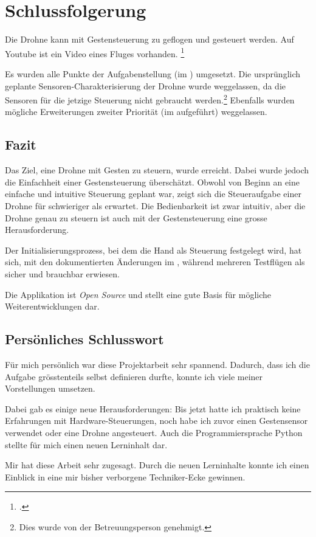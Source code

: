 \chapter{Schlussfolgerung}
Die Drohne kann mit Gestensteuerung zu geflogen und gesteuert werden.
Auf Youtube ist ein Video eines Fluges vorhanden.
\footcite{Crazyflie_20_with_Leap_Motion_Gesture_controlled_YouTube_2015-09-04}

Es wurden alle Punkte der Aufgabenstellung (im ) umgesetzt.
Die ursprünglich geplante Sensoren-Charakterisierung der Drohne wurde weggelassen, da die Sensoren für die jetzige Steuerung nicht gebraucht werden.\footnote{Dies wurde von der Betreuungsperson genehmigt.}
Ebenfalls wurden mögliche Erweiterungen zweiter Priorität (im  aufgeführt) weggelassen.

\section{Fazit}
Das Ziel, eine Drohne mit Gesten zu steuern, wurde erreicht.
Dabei wurde jedoch die Einfachheit einer Gestensteuerung überschätzt.
Obwohl von Beginn an eine einfache und intuitive Steuerung geplant war, zeigt sich die Steueraufgabe einer Drohne für schwieriger als erwartet.
Die Bedienbarkeit ist zwar intuitiv, aber die Drohne genau zu steuern ist auch mit der Gestensteuerung eine grosse Herausforderung.

Der Initialisierungsprozess, bei dem die Hand als Steuerung festgelegt wird, hat sich, mit den dokumentierten Änderungen im , während mehreren Testflügen als sicher und brauchbar erwiesen.

Die Applikation ist \textit{Open Source} und stellt eine gute Basis für mögliche Weiterentwicklungen dar.


\section{Persönliches Schlusswort}
Für mich persönlich war diese Projektarbeit sehr spannend.
Dadurch, dass ich die Aufgabe grösstenteils selbst definieren durfte, konnte ich viele meiner Vorstellungen umsetzen.

Dabei gab es einige neue Herausforderungen:
Bis jetzt hatte ich praktisch keine Erfahrungen mit Hardware-Steuerungen, noch habe ich zuvor einen Gestensensor verwendet oder eine Drohne angesteuert.
Auch die Programmiersprache Python stellte für mich einen neuen Lerninhalt dar.

Mir hat diese Arbeit sehr zugesagt.
Durch die neuen Lerninhalte konnte ich einen Einblick in eine mir bisher verborgene Techniker-Ecke gewinnen.
